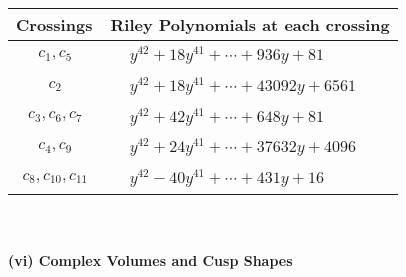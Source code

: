 \documentclass[1p]{elsarticle_modified}
\theoremstyle{definition}
\begin{document}
\begin{tabular}{m{50pt}|m{274pt}}
Crossings & \hspace{64pt}Riley Polynomials at each crossing \\
\hline $$\begin{aligned}c_{1},c_{5}\end{aligned}$$&$\begin{aligned}
&y^{42}+18 y^{41}+\cdots+936 y+81
\end{aligned}$\\
\hline $$\begin{aligned}c_{2}\end{aligned}$$&$\begin{aligned}
&y^{42}+18 y^{41}+\cdots+43092 y+6561
\end{aligned}$\\
\hline $$\begin{aligned}c_{3},c_{6},c_{7}\end{aligned}$$&$\begin{aligned}
&y^{42}+42 y^{41}+\cdots+648 y+81
\end{aligned}$\\
\hline $$\begin{aligned}c_{4},c_{9}\end{aligned}$$&$\begin{aligned}
&y^{42}+24 y^{41}+\cdots+37632 y+4096
\end{aligned}$\\
\hline $$\begin{aligned}c_{8},c_{10},c_{11}\end{aligned}$$&$\begin{aligned}
&y^{42}-40 y^{41}+\cdots+431 y+16
\end{aligned}$\\
\hline
\end{tabular}\\~\\
\newpage\flushleft \textbf{(vi) Complex Volumes and Cusp Shapes}
\end{document}
